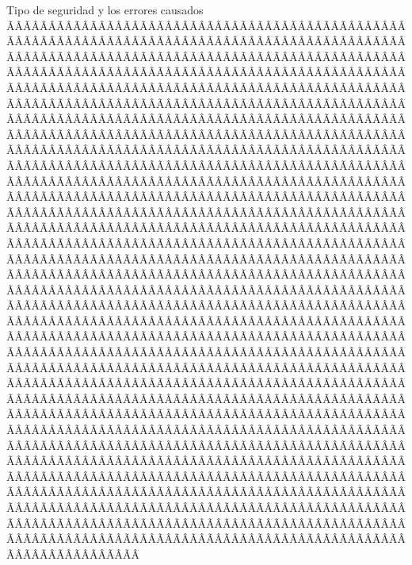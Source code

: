Tipo de seguridad y los errores causados ÃÂÃÂÃÂÃÂÃÂÃÂÃÂÃÂÃÂÃÂÃÂÃÂÃÂÃÂÃÂÃÂÃÂÃÂÃÂÃÂÃÂÃÂÃÂÃÂÃÂÃÂÃÂÃÂÃÂÃÂÃÂÃÂÃÂÃÂÃÂÃÂÃÂÃÂÃÂÃÂÃÂÃÂÃÂÃÂÃÂÃÂÃÂÃÂÃÂÃÂÃÂÃÂÃÂÃÂÃÂÃÂÃÂÃÂÃÂÃÂÃÂÃÂÃÂÃÂÃÂÃÂÃÂÃÂÃÂÃÂÃÂÃÂÃÂÃÂÃÂÃÂÃÂÃÂÃÂÃÂÃÂÃÂÃÂÃÂÃÂÃÂÃÂÃÂÃÂÃÂÃÂÃÂÃÂÃÂÃÂÃÂÃÂÃÂÃÂÃÂÃÂÃÂÃÂÃÂÃÂÃÂÃÂÃÂÃÂÃÂÃÂÃÂÃÂÃÂÃÂÃÂÃÂÃÂÃÂÃÂÃÂÃÂÃÂÃÂÃÂÃÂÃÂÃÂÃÂÃÂÃÂÃÂÃÂÃÂÃÂÃÂÃÂÃÂÃÂÃÂÃÂÃÂÃÂÃÂÃÂÃÂÃÂÃÂÃÂÃÂÃÂÃÂÃÂÃÂÃÂÃÂÃÂÃÂÃÂÃÂÃÂÃÂÃÂÃÂÃÂÃÂÃÂÃÂÃÂÃÂÃÂÃÂÃÂÃÂÃÂÃÂÃÂÃÂÃÂÃÂÃÂÃÂÃÂÃÂÃÂÃÂÃÂÃÂÃÂÃÂÃÂÃÂÃÂÃÂÃÂÃÂÃÂÃÂÃÂÃÂÃÂÃÂÃÂÃÂÃÂÃÂÃÂÃÂÃÂÃÂÃÂÃÂÃÂÃÂÃÂÃÂÃÂÃÂÃÂÃÂÃÂÃÂÃÂÃÂÃÂÃÂÃÂÃÂÃÂÃÂÃÂÃÂÃÂÃÂÃÂÃÂÃÂÃÂÃÂÃÂÃÂÃÂÃÂÃÂÃÂÃÂÃÂÃÂÃÂÃÂÃÂÃÂÃÂÃÂÃÂÃÂÃÂÃÂÃÂÃÂÃÂÃÂÃÂÃÂÃÂÃÂÃÂÃÂÃÂÃÂÃÂÃÂÃÂÃÂÃÂÃÂÃÂÃÂÃÂÃÂÃÂÃÂÃÂÃÂÃÂÃÂÃÂÃÂÃÂÃÂÃÂÃÂÃÂÃÂÃÂÃÂÃÂÃÂÃÂÃÂÃÂÃÂÃÂÃÂÃÂÃÂÃÂÃÂÃÂÃÂÃÂÃÂÃÂÃÂÃÂÃÂÃÂÃÂÃÂÃÂÃÂÃÂÃÂÃÂÃÂÃÂÃÂÃÂÃÂÃÂÃÂÃÂÃÂÃÂÃÂÃÂÃÂÃÂÃÂÃÂÃÂÃÂÃÂÃÂÃÂÃÂÃÂÃÂÃÂÃÂÃÂÃÂÃÂÃÂÃÂÃÂÃÂÃÂÃÂÃÂÃÂÃÂÃÂÃÂÃÂÃÂÃÂÃÂÃÂÃÂÃÂÃÂÃÂÃÂÃÂÃÂÃÂÃÂÃÂÃÂÃÂÃÂÃÂÃÂÃÂÃÂÃÂÃÂÃÂÃÂÃÂÃÂÃÂÃÂÃÂÃÂÃÂÃÂÃÂÃÂÃÂÃÂÃÂÃÂÃÂÃÂÃÂÃÂÃÂÃÂÃÂÃÂÃÂÃÂÃÂÃÂÃÂÃÂÃÂÃÂÃÂÃÂÃÂÃÂÃÂÃÂÃÂÃÂÃÂÃÂÃÂÃÂÃÂÃÂÃÂÃÂÃÂÃÂÃÂÃÂÃÂÃÂÃÂÃÂÃÂÃÂÃÂÃÂÃÂÃÂÃÂÃÂÃÂÃÂÃÂÃÂÃÂÃÂÃÂÃÂÃÂÃÂÃÂÃÂÃÂÃÂÃÂÃÂÃÂÃÂÃÂÃÂÃÂÃÂÃÂÃÂÃÂÃÂÃÂÃÂÃÂÃÂÃÂÃÂÃÂÃÂÃÂÃÂÃÂÃÂÃÂÃÂÃÂÃÂÃÂÃÂÃÂÃÂÃÂÃÂÃÂÃÂÃÂÃÂÃÂÃÂÃÂÃÂÃÂÃÂÃÂÃÂÃÂÃÂÃÂÃÂÃÂÃÂÃÂÃÂÃÂÃÂÃÂÃÂÃÂÃÂÃÂÃÂÃÂÃÂÃÂÃÂÃÂÃÂÃÂÃÂÃÂÃÂÃÂÃÂÃÂÃÂÃÂÃÂÃÂÃÂÃÂÃÂÃÂÃÂÃÂÃÂÃÂÃÂÃÂÃÂÃÂÃÂÃÂÃÂÃÂÃÂÃÂÃÂÃÂÃÂÃÂÃÂÃÂÃÂÃÂÃÂÃÂÃÂÃÂÃÂÃÂÃÂÃÂÃÂÃÂÃÂÃÂÃÂÃÂÃÂÃÂÃÂÃÂÃÂÃÂÃÂÃÂÃÂÃÂÃÂÃÂÃÂÃÂÃÂÃÂÃÂÃÂÃÂÃÂÃÂÃÂÃÂÃÂÃÂÃÂÃÂÃÂÃÂÃÂÃÂÃÂÃÂÃÂÃÂÃÂÃÂÃÂÃÂÃÂÃÂÃÂÃÂÃÂÃÂÃÂÃÂÃÂÃÂÃÂÃÂÃÂÃÂÃÂÃÂÃÂÃÂÃÂÃÂÃÂÃÂÃÂÃÂÃÂÃÂÃÂÃÂÃÂÃÂÃÂÃÂÃÂÃÂÃÂÃÂÃÂÃÂÃÂÃÂÃÂÃÂÃÂÃÂÃÂÃÂÃÂÃÂÃÂÃÂÃÂÃÂÃÂÃÂÃÂÃÂÃÂÃÂÃÂÃÂÃÂÃÂÃÂÃÂÃÂÃÂÃÂÃÂÃÂÃÂÃÂÃÂÃÂÃÂÃÂÃÂÃÂÃÂÃÂÃÂÃÂÃÂÃÂÃÂÃÂÃÂÃÂÃÂÃÂÃÂÃÂÃÂÃÂÃÂÃÂÃÂÃÂÃÂÃÂÃÂÃÂÃÂÃÂÃÂÃÂÃÂÃÂÃÂÃÂÃÂÃÂÃÂÃÂÃÂÃÂÃÂÃÂÃÂÃÂÃÂÃÂÃÂÃÂÃÂÃÂÃÂÃÂÃÂÃÂÃÂÃÂÃÂÃÂÃÂÃÂÃÂÃÂÃÂÃÂÃÂÃÂÃÂÃÂÃÂÃÂÃÂÃÂÃÂÃÂÃÂÃÂÃÂÃÂÃÂÃÂÃÂÃÂÃÂÃÂÃÂÃÂÃÂÃÂÃÂÃÂÃÂÃÂÃÂÃÂÃÂÃÂÃÂÃÂÃÂÃÂÃÂÃÂÃÂÃÂÃÂÃÂÃÂÃÂÃÂÃÂÃÂÃÂÃÂÃÂÃÂÃÂÃÂÃÂÃÂÃÂÃÂÃÂÃÂÃÂÃÂ